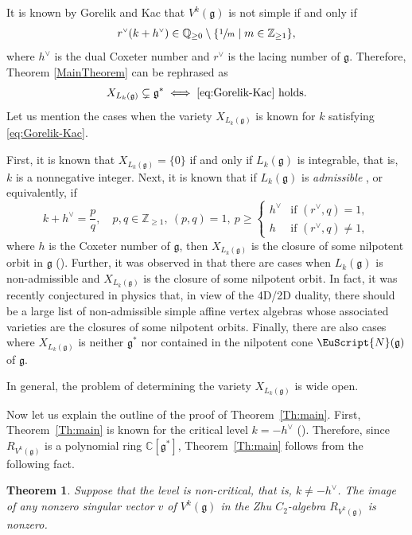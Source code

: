 \documentclass[JEP,XML,SOM,Unicode]{cedram}
\let\oldvee\vee
\renewcommand{\vee}{{\scriptscriptstyle\oldvee}}
\let\mathcal \EuScript
\newcommand\C{{\mathbb C}}
\newcommand\Q{{\mathbb Q}}
\newcommand\Z{{\mathbb Z}}
\newcommand \g{\mathfrak g}
\newtheorem{theorem}{Theorem}[section]
\theoremstyle{definition}
\begin{document}
It is known by Gorelik and Kac \cite{GorKac07}
that $V^k(\g)$
is not simple if and only if
\begin{equation}
r^{\vee}(k+h^{\vee}) \in \Q_{\geq 0}\setminus\{\sfrac{1}{m}\mid m\in \Z_{\geq 1}\},
\label{eq:Gorelik-Kac}
\end{equation}
where
$h^{\vee}$ is the dual Coxeter number and
$r^{\vee}$ is the lacing number of $\g$.
Therefore,
Theorem \ref{MainTheorem} can be rephrased as
\begin{equation}
X_{L_k(\g)}\subsetneq \g^*\iff \text{\eqref{eq:Gorelik-Kac} holds.}
\end{equation}
Let us mention the cases when the variety $X_{L_k(\g)}$
is known
for $k$ satisfying \eqref{eq:Gorelik-Kac}.

First, it is known \cite{Zhu96,DonMas06} that $X_{L_k(\g)}=\{0\}$
if and only if $L_k(\g)$ is integrable, that is,
$k$ is a nonnegative integer.
Next, it is known that if $L_k(\g)$ is \emph{admissible} \cite{KacWak89},
or equivalently,
if
\begin{equation*}
k+h^{\vee}=\frac{p}{q},\quad p,q\in \Z_{\geq 1}, \ (p,q)=1,\
p\geq \begin{cases}h^{\vee}&\text{if }(r^{\vee},q)=1,\\
h&\text{if }(r^{\vee},q)\ne 1,
\end{cases}
\end{equation*}
where $h$ is the Coxeter number of $\g$,
then
$X_{L_k(\g)}$ is the closure of some nilpotent orbit in $\g$ (\cite{Ara09b}).
Further, it was observed in \cite{AM15,AM17}
that
there are cases when $L_k(\g)$ is
non-admissible and
$X_{L_k(\g)}$ is the closure of some nilpotent orbit.
In fact,
it was recently
conjectured in physics \cite{XieYan2019lisse} that,
in view of the 4D/2D duality,
there should be
a large list of non-admissible simple affine vertex algebras
whose associated varieties are the closures of some nilpotent orbits.
Finally,
there are also cases \cite{AM16} where $X_{L_k(\g)}$
is neither $\g^*$ nor contained in the nilpotent cone $\mathcal{N}(\g)$
of $\g$.

In general,
the problem of determining the variety $X_{L_k(\g)}$ is wide open.

Now let us explain
the outline of
the proof of Theorem~\ref{Th:main}.
First, Theorem~\ref{Th:main} is known for the critical level $k=-h^\vee$
(\cite{FeiFre92,FreGai04}). Therefore, since $R_{V^k(\g)}$ is a polynomial ring $\C[\g^*]$,
Theorem~\ref{Th:main} follows from the following fact.
\begin{theorem}\label{theorem:image-of-the-singular}
Suppose that the level is non-critical, that is, $k\ne -h^\vee$.
The image of any nonzero singular vector $v$ of $V^k(\g)$
in the Zhu $C_2$-algebra $R_{V^k(\g)}$ is nonzero.
\end{theorem}
\end{document}
